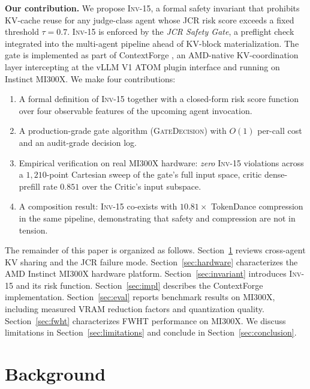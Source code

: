 \documentclass[10pt,twocolumn]{article}
\newcommand{\INV}[1]{\textsc{Inv-#1}}
\newcommand{\GateDecision}{\textsc{GateDecision}}
\begin{document}
\textbf{Our contribution.} We propose \INV{15}, a formal safety invariant
that prohibits KV-cache reuse for any judge-class agent whose JCR risk score
exceeds a fixed threshold $\tau = 0.7$. \INV{15} is enforced by the
\emph{JCR Safety Gate}, a preflight check integrated into the multi-agent
pipeline ahead of KV-block materialization. The gate is implemented as part
of ContextForge \cite{contextforge}, an AMD-native KV-coordination layer
intercepting at the vLLM V1 ATOM plugin interface and running on Instinct
MI300X. We make four contributions:
\begin{enumerate}
  \item A formal definition of \INV{15} together with a closed-form risk
        score function over four observable features of the upcoming agent
        invocation.
  \item A production-grade gate algorithm (\GateDecision) with $O(1)$
        per-call cost and an audit-grade decision log.
  \item Empirical verification on real MI300X hardware: \emph{zero}
        \INV{15} violations across a $1{,}210$-point Cartesian sweep of
        the gate's full input space, critic dense-prefill rate $0.851$
        over the Critic's input subspace.
  \item A composition result: \INV{15} co-exists with $10.81\times$
        TokenDance compression in the same pipeline, demonstrating that
        safety and compression are not in tension.
\end{enumerate}

The remainder of this paper is organized as follows.
Section~\ref{sec:background} reviews cross-agent KV sharing and the JCR
failure mode. Section~\ref{sec:hardware} characterizes the AMD Instinct MI300X
hardware platform. Section~\ref{sec:invariant} introduces \INV{15} and its
risk function. Section~\ref{sec:impl} describes the ContextForge
implementation. Section~\ref{sec:eval} reports benchmark results on MI300X,
including measured VRAM reduction factors and quantization quality.
Section~\ref{sec:fwht} characterizes FWHT performance on MI300X.
We discuss limitations in Section~\ref{sec:limitations} and conclude in
Section~\ref{sec:conclusion}.

\section{Background}
\label{sec:background}
\end{document}
